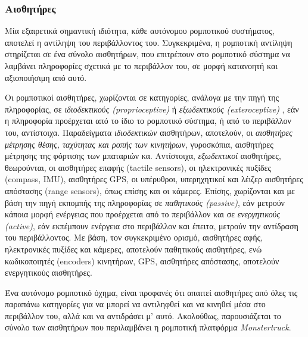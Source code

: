 \bigskip
\subsubsection{Αισθητήρες} \label{sssec:sensors}
Μία εξαιρετικά σημαντική ιδιότητα, κάθε αυτόνομου ρομποτικού συστήματος, αποτελεί η αντίληψη του περιβάλλοντος του. Συγκεκριμένα, η ρομποτική αντίληψη στηρίζεται σε ένα σύνολο αισθητήρων, που επιτρέπουν στο ρομποτικό σύστημα να λαμβάνει πληροφορίες σχετικά με το περιβάλλον του, σε μορφή κατανοητή και αξιοποιήσιμη από αυτό.

\bigskip
Οι ρομποτικοί αισθητήρες, χωρίζονται σε κατηγορίες, ανάλογα με την πηγή της πληροφορίας, σε \textit{ιδιοδεκτικούς (proprioceptive)} ή \textit{εξωδεκτικούς (exteroceptive)} \cite{autonomous_mobile_robots}, εάν η πληροφορία προέρχεται από το ίδιο το ρομποτικό σύστημα, ή από το περιβάλλον του, αντίστοιχα. Παραδείγματα \textit{ιδιοδεκτικών} αισθητήρων, αποτελούν, οι \textit{αισθητήρες μέτρησης θέσης, ταχύτητας και ροπής των κινητήρων}, {γυροσκόπια}, {αισθητήρες μέτρησης της φόρτισης των μπαταριών} κα. Αντίστοιχα, \textit{εξωδεκτικοί} αισθητήρες, θεωρούνται, οι {αισθητήρες επαφής (tactile sensors)}, οι {ηλεκτρονικές πυξίδες (compass, IMU)}, αισθητήρες {GPS}, οι {υπέρυθροι, υπερηχητικοί και λέιζερ αισθητήρες απόστασης (range sensors)}, όπως επίσης και οι {κάμερες}. Επίσης, χωρίζονται και με βάση την πηγή εκπομπής της πληροφορίας \cite{autonomous_mobile_robots} σε \textit{παθητικούς (passive)}, εάν μετρούν κάποια μορφή ενέργειας που προέρχεται από το περιβάλλον και σε \textit{ενεργητικούς (active)}, εάν εκπέμπουν ενέργεια στο περιβάλλον και έπειτα, μετρούν την αντίδραση του περιβάλλοντος. Με βάση, τον συγκεκριμένο ορισμό, {αισθητήρες αφής}, {ηλεκτρονικές πυξίδες} και {κάμερες}, αποτελούν {παθητικούς} αισθητήρες, ενώ {κωδικοποιητές (encoders) κινητήρων}, {GPS}, {αισθητήρες απόστασης}, αποτελούν {ενεργητικούς} αισθητήρες. 

\bigskip
Ένα αυτόνομο ρομποτικό όχημα, είναι προφανές ότι απαιτεί αισθητήρες από όλες τις παραπάνω κατηγορίες για να μπορεί να αντιληφθεί και να κινηθεί μέσα στο περιβάλλον του, αλλά και να αντιδράσει μ' αυτό. Ακολούθως, παρουσιάζεται το σύνολο των αισθητήρων που περιλαμβάνει η ρομποτική πλατφόρμα \textit{Monstertruck}.

